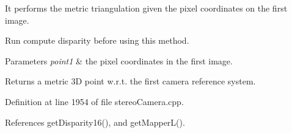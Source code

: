 It performs the metric triangulation given the pixel coordinates on the first image. 

Run compute disparity before using this method. 
\begin{DoxyParams}{Parameters}
{\em point1} & the pixel coordinates in the first image. \\
\hline
\end{DoxyParams}
\begin{DoxyReturn}{Returns}
a metric 3D point w.\+r.\+t. the first camera reference system. 
\end{DoxyReturn}


Definition at line 1954 of file stereo\+Camera.\+cpp.



References get\+Disparity16(), and get\+Mapper\+L().


